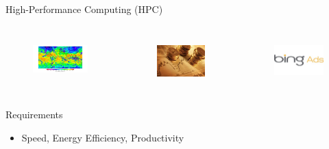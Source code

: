 \begin{frame}{High-Performance Computing (HPC)}
  \begin{columns}
    \begin{figure}[ht]
      \centering
      \includegraphics[scale=0.4, clip=true, trim=50 50 50 0]{figs/weather-forecasting.jpg}\\
    \end{figure}
    \begin{figure}[ht]
      \centering
      \includegraphics[scale=0.29, clip=true, trim=0 20 0 20]{figs/finance.jpg}\\
    \end{figure}
    \begin{figure}[ht]
      \centering
      \includegraphics[scale=0.25]{figs/ads.jpg}\\
    \end{figure}
  \end{columns}
  \vspace{0.5cm}

  \begin{beamerboxesrounded}{Requirements}
    \begin{itemize}
    \item Speed, Energy Efficiency, Productivity
    \end{itemize}
  \end{beamerboxesrounded}
  \vspace{0.5cm}


\end{frame}
